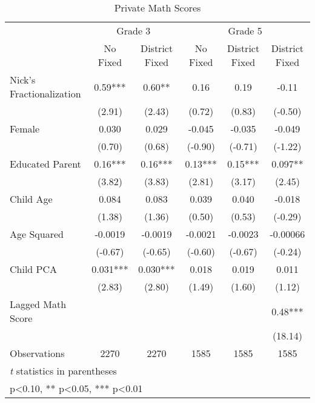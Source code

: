 \begin{table}[htbp]\centering
\def\sym#1{\ifmmode^{#1}\else\(^{#1}\)\fi}
\caption{Private Math Scores}
\begin{tabular}{l*{5}{c}}
\toprule
                &\multicolumn{2}{c}{Grade 3}&\multicolumn{3}{c}{Grade 5}           \\\cmidrule(lr){2-3}\cmidrule(lr){4-6}
                &\multicolumn{1}{c}{No Fixed}&\multicolumn{1}{c}{District Fixed}&\multicolumn{1}{c}{No Fixed}&\multicolumn{1}{c}{District Fixed}&\multicolumn{1}{c}{District Fixed}\\
\midrule
Nick's Fractionalization&     0.59***&     0.60** &     0.16   &     0.19   &    -0.11   \\
                &   (2.91)   &   (2.43)   &   (0.72)   &   (0.83)   &  (-0.50)   \\
Female          &    0.030   &    0.029   &   -0.045   &   -0.035   &   -0.049   \\
                &   (0.70)   &   (0.68)   &  (-0.90)   &  (-0.71)   &  (-1.22)   \\
Educated Parent &     0.16***&     0.16***&     0.13***&     0.15***&    0.097** \\
                &   (3.82)   &   (3.83)   &   (2.81)   &   (3.17)   &   (2.45)   \\
Child Age       &    0.084   &    0.083   &    0.039   &    0.040   &   -0.018   \\
                &   (1.38)   &   (1.36)   &   (0.50)   &   (0.53)   &  (-0.29)   \\
Age Squared     &  -0.0019   &  -0.0019   &  -0.0021   &  -0.0023   & -0.00066   \\
                &  (-0.67)   &  (-0.65)   &  (-0.60)   &  (-0.67)   &  (-0.24)   \\
Child PCA       &    0.031***&    0.030***&    0.018   &    0.019   &    0.011   \\
                &   (2.83)   &   (2.80)   &   (1.49)   &   (1.60)   &   (1.12)   \\
Lagged Math Score&            &            &            &            &     0.48***\\
                &            &            &            &            &  (18.14)   \\
\midrule
Observations    &     2270   &     2270   &     1585   &     1585   &     1585   \\
\bottomrule
\multicolumn{6}{l}{\footnotesize \textit{t} statistics in parentheses}\\
\multicolumn{6}{l}{\footnotesize * p<0.10, ** p<0.05, *** p<0.01}\\
\end{tabular}
\end{table}
